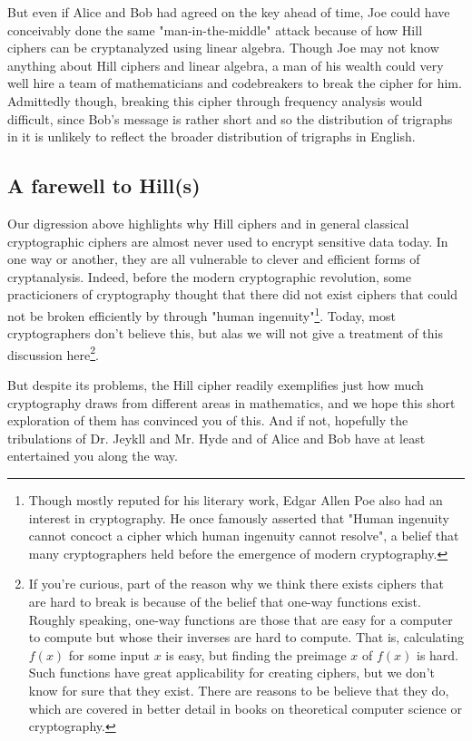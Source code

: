 \documentclass{paper}
\begin{document}
\medskip
But even if Alice and Bob had agreed on the key ahead of time, Joe could have conceivably done the same "man-in-the-middle" attack because of how Hill ciphers can be cryptanalyzed using linear algebra. Though Joe may not know anything about Hill ciphers and linear algebra, a man of his wealth could very well hire a team of mathematicians and codebreakers to break the cipher for him. Admittedly though, breaking this cipher through frequency analysis would difficult, since Bob's message is rather short and so the distribution of trigraphs in it is unlikely to reflect the broader distribution of trigraphs in English. 

\subsection{A farewell to Hill(s)}

Our digression above highlights why Hill ciphers and in general classical cryptographic ciphers are almost never used to encrypt sensitive data today. In one way or another, they are all vulnerable to clever and efficient forms of cryptanalysis. Indeed, before the modern cryptographic revolution, some practicioners of cryptography thought that there did not exist ciphers that could not be broken efficiently by through "human ingenuity"\footnote{Though mostly reputed for his literary work, Edgar Allen Poe also had an interest in cryptography. He once famously asserted that "Human ingenuity cannot concoct a cipher which human ingenuity cannot resolve", a belief that many cryptographers held before the emergence of modern cryptography.}. Today, most cryptographers don't believe this, but alas we will not give a treatment of this discussion here\footnote{If you're curious, part of the reason why we think there exists ciphers that are hard to break is because of the belief that one-way functions exist. Roughly speaking, one-way functions are those that are easy for a computer to compute but  whose their inverses are hard to compute. That is, calculating $f(x)$ for some input $x$ is easy, but finding the preimage $x$ of $f(x)$ is hard. Such functions have great applicability for creating ciphers, but we don't know for sure that they exist. There are reasons to be believe that they do, which are covered in better detail in books on theoretical computer science or cryptography.}.

\medskip
But despite its problems, the Hill cipher readily exemplifies just how much cryptography draws from different areas in mathematics, and we hope this short exploration of them has convinced you of this. And if not, hopefully the tribulations of Dr. Jeykll and Mr. Hyde and of Alice and Bob have at least entertained you along the way.
\end{document}
